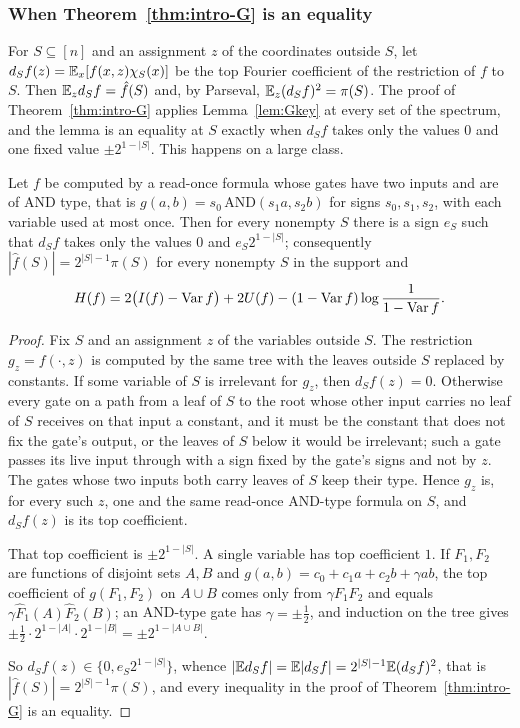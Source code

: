 \subsubsection*{When Theorem~\ref{thm:intro-G} is an equality}
For $S\subseteq[n]$ and an assignment $z$ of the coordinates outside $S$, let $d_Sf(z)=\mathbb{E}_x[f(x,z)\chi_S(x)]$ be the top Fourier coefficient of the restriction of $f$ to $S$. Then $\mathbb{E}_zd_Sf=\hat f(S)$ and, by Parseval, $\mathbb{E}_z(d_Sf)^2=\pi(S)$. The proof of Theorem~\ref{thm:intro-G} applies Lemma~\ref{lem:Gkey} at every set of the spectrum, and the lemma is an equality at $S$ exactly when $d_Sf$ takes only the values $0$ and one fixed value $\pm2^{1-|S|}$. This happens on a large class.

\begin{proposition}\label{prop:readonce-eq}
Let $f$ be computed by a read-once formula whose gates have two inputs and are of AND type, that is $g(a,b)=s_0\,\mathrm{AND}(s_1a,s_2b)$ for signs $s_0,s_1,s_2$, with each variable used at most once. Then for every nonempty $S$ there is a sign $e_S$ such that $d_Sf$ takes only the values $0$ and $e_S2^{1-|S|}$; consequently $|\hat f(S)|=2^{|S|-1}\pi(S)$ for every nonempty $S$ in the support and
\[
H(f)=2\bigl(I(f)-\operatorname{Var} f\bigr)+2U(f)-(1-\operatorname{Var} f)\log\frac1{1-\operatorname{Var} f}.
\]
\end{proposition}

\begin{proof}
Fix $S$ and an assignment $z$ of the variables outside $S$. The restriction $g_z=f(\cdot,z)$ is computed by the same tree with the leaves outside $S$ replaced by constants. If some variable of $S$ is irrelevant for $g_z$, then $d_Sf(z)=0$. Otherwise every gate on a path from a leaf of $S$ to the root whose other input carries no leaf of $S$ receives on that input a constant, and it must be the constant that does not fix the gate's output, or the leaves of $S$ below it would be irrelevant; such a gate passes its live input through with a sign fixed by the gate's signs and not by $z$. The gates whose two inputs both carry leaves of $S$ keep their type. Hence $g_z$ is, for every such $z$, one and the same read-once AND-type formula on $S$, and $d_Sf(z)$ is its top coefficient.

That top coefficient is $\pm2^{1-|S|}$. A single variable has top coefficient $1$. If $F_1,F_2$ are functions of disjoint sets $A,B$ and $g(a,b)=c_0+c_1a+c_2b+\gamma ab$, the top coefficient of $g(F_1,F_2)$ on $A\cup B$ comes only from $\gamma F_1F_2$ and equals $\gamma\hat F_1(A)\hat F_2(B)$; an AND-type gate has $\gamma=\pm\frac12$, and induction on the tree gives $\pm\frac12\cdot2^{1-|A|}\cdot2^{1-|B|}=\pm2^{1-|A\cup B|}$.

So $d_Sf(z)\in\{0,e_S2^{1-|S|}\}$, whence $|\mathbb{E} d_Sf|=\mathbb{E}|d_Sf|=2^{|S|-1}\mathbb{E}(d_Sf)^2$, that is $|\hat f(S)|=2^{|S|-1}\pi(S)$, and every inequality in the proof of Theorem~\ref{thm:intro-G} is an equality.
\end{proof}

